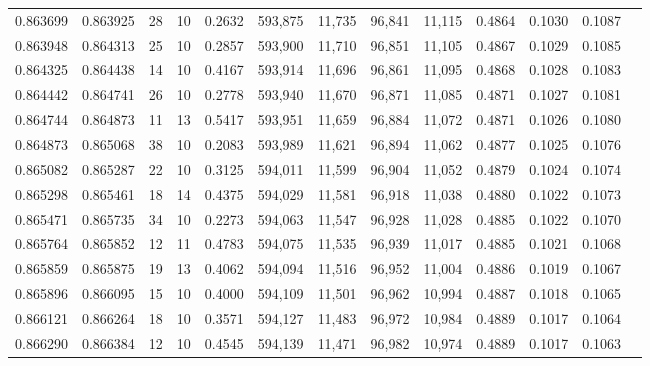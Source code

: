 \begin{tabular}{rrrrrrrrrrrrr}
0.863699 & 0.863925 &    28 &  10 &                                     0.2632 & 593,875 &  11,735 &  96,841 &  11,115 & 0.4864 & 0.1030 & 0.1087 \\
0.863948 & 0.864313 &    25 &  10 &                                     0.2857 & 593,900 &  11,710 &  96,851 &  11,105 & 0.4867 & 0.1029 & 0.1085 \\
0.864325 & 0.864438 &    14 &  10 &                                     0.4167 & 593,914 &  11,696 &  96,861 &  11,095 & 0.4868 & 0.1028 & 0.1083 \\
0.864442 & 0.864741 &    26 &  10 &                                     0.2778 & 593,940 &  11,670 &  96,871 &  11,085 & 0.4871 & 0.1027 & 0.1081 \\
0.864744 & 0.864873 &    11 &  13 &                                     0.5417 & 593,951 &  11,659 &  96,884 &  11,072 & 0.4871 & 0.1026 & 0.1080 \\
0.864873 & 0.865068 &    38 &  10 &                                     0.2083 & 593,989 &  11,621 &  96,894 &  11,062 & 0.4877 & 0.1025 & 0.1076 \\
0.865082 & 0.865287 &    22 &  10 &                                     0.3125 & 594,011 &  11,599 &  96,904 &  11,052 & 0.4879 & 0.1024 & 0.1074 \\
0.865298 & 0.865461 &    18 &  14 &                                     0.4375 & 594,029 &  11,581 &  96,918 &  11,038 & 0.4880 & 0.1022 & 0.1073 \\
0.865471 & 0.865735 &    34 &  10 &                                     0.2273 & 594,063 &  11,547 &  96,928 &  11,028 & 0.4885 & 0.1022 & 0.1070 \\
0.865764 & 0.865852 &    12 &  11 &                                     0.4783 & 594,075 &  11,535 &  96,939 &  11,017 & 0.4885 & 0.1021 & 0.1068 \\
0.865859 & 0.865875 &    19 &  13 &                                     0.4062 & 594,094 &  11,516 &  96,952 &  11,004 & 0.4886 & 0.1019 & 0.1067 \\
0.865896 & 0.866095 &    15 &  10 &                                     0.4000 & 594,109 &  11,501 &  96,962 &  10,994 & 0.4887 & 0.1018 & 0.1065 \\
0.866121 & 0.866264 &    18 &  10 &                                     0.3571 & 594,127 &  11,483 &  96,972 &  10,984 & 0.4889 & 0.1017 & 0.1064 \\
0.866290 & 0.866384 &    12 &  10 &                                     0.4545 & 594,139 &  11,471 &  96,982 &  10,974 & 0.4889 & 0.1017 & 0.1063 \\

\end{tabular}
